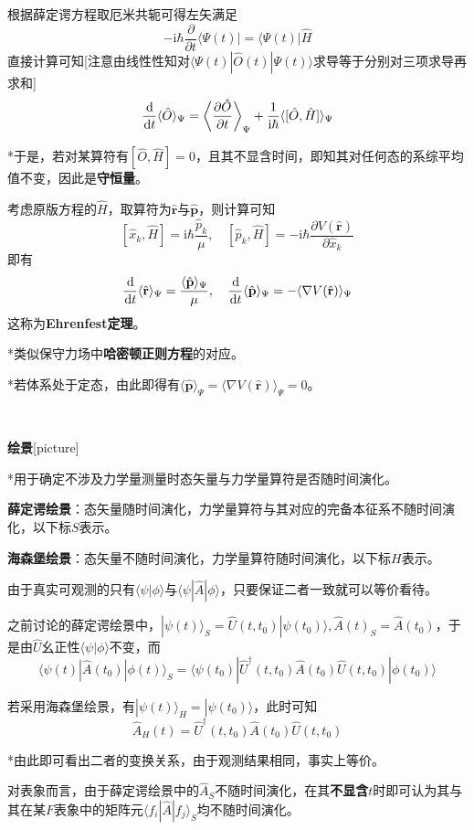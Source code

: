 \documentclass[a4paper,UTF8,fontset=windows]{ctexart}
\newcommand*{\dr}{\hspace{0.07em}\mathrm{d}}
\newcommand*{\ir}{\mathrm{i}}
\newcommand*{\ket}[1]{|#1\rangle}
\newcommand*{\bra}[1]{\langle#1|}
\newcommand*{\bk}[2]{\langle#1|#2\rangle}
\newcommand*{\blk}[3]{\langle#1|#2|#3\rangle}
\newcommand*{\br}{\mathbf{r}}
\newcommand*{\bp}{\mathbf{p}}
\begin{document}
根据薛定谔方程取厄米共轭可得左矢满足
$$-\ir\hbar\frac{\partial}{\partial t}\bra{\Psi(t)}=\bra{\Psi(t)}\hat{H}$$
直接计算可知[注意由线性性知对$\blk{\Psi(t)}{\hat{O}(t)}{\Psi(t)}$求导等于分别对三项求导再求和]
$$\frac{\dr}{\dr t}\langle\hat{O}\rangle_\Psi=\bigg<\frac{\partial\hat{O}}{\partial t}\bigg>_\Psi+\frac{1}{\ir\hbar}\langle[\hat{O},\hat{H}]\rangle_\Psi$$

*于是，若对某算符有$[\hat{O},\hat{H}]=0$，且其不显含时间，即知其对任何态的系综平均值不变，因此是\textbf{守恒量}。

考虑原版方程的$\hat{H}$，取算符为$\hat{\br}$与$\hat{\bp}$，则计算可知
$$[\hat{x}_k,\hat{H}]=\ir\hbar\frac{\hat{p}_k}{\mu},\quad[\hat{p}_k,\hat{H}]=-\ir\hbar\frac{\partial V(\hat{\br})}{\partial\hat{x}_k}$$
即有
$$\frac{\dr}{\dr t}\langle\hat{\br}\rangle_\Psi=\frac{\langle\hat{\bp}\rangle_\Psi}{\mu},\quad\frac{\dr}{\dr t}\langle\hat{\bp}\rangle_\Psi=-\langle\nabla V(\hat{\br})\rangle_\Psi$$
这称为\textbf{Ehrenfest定理}。

*类似保守力场中\textbf{哈密顿正则方程}的对应。

*若体系处于定态，由此即得有$\langle\hat{\bp}\rangle_\Psi=\langle\nabla V(\hat{\br})\rangle_\Psi=0$。

\

\textbf{绘景}[picture]

*用于确定不涉及力学量测量时态矢量与力学量算符是否随时间演化。

\textbf{薛定谔绘景}：态矢量随时间演化，力学量算符与其对应的完备本征系不随时间演化，以下标$S$表示。

\textbf{海森堡绘景}：态矢量不随时间演化，力学量算符随时间演化，以下标$H$表示。

由于真实可观测的只有$\bk{\psi}{\phi}$与$\blk{\psi}{\hat{A}}{\phi}$，只要保证二者一致就可以等价看待。

之前讨论的薛定谔绘景中，$\ket{\psi(t)}_S=\hat{U}(t,t_0)\ket{\psi(t_0)},\hat{A}(t)_S=\hat{A}(t_0)$，于是由$\hat{U}$幺正性$\bk{\psi}{\phi}$不变，而
$$\blk{\psi(t)}{\hat{A}(t_0)}{\phi(t)}_S=\bra{\psi(t_0)}\hat{U}^\dagger(t,t_0)\hat{A}(t_0)\hat{U}(t,t_0)\ket{\phi(t_0)}$$

若采用海森堡绘景，有$\ket{\psi(t)}_H=\ket{\psi(t_0)}$，此时可知
$$\hat{A}_H(t)=\hat{U}^\dagger(t,t_0)\hat{A}(t_0)\hat{U}(t,t_0)$$

*由此即可看出二者的变换关系，由于观测结果相同，事实上等价。

对表象而言，由于薛定谔绘景中的$\hat{A}_S$不随时间演化，在其\textbf{不显含}$t$时即可认为其与其在某$F$表象中的矩阵元$\blk{f_i}{\hat{A}}{f_j}_S$均不随时间演化。
\end{document}
